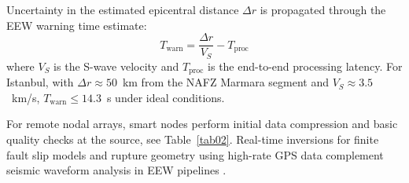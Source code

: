 \documentclass[data,article,accept,pdftex,moreauthors]{Definitions/mdpi}
\begin{document}

Uncertainty in the estimated epicentral distance $\Delta r$ is propagated through the EEW warning time estimate:
\begin{equation}
T_{\text{warn}} = \frac{\Delta r}{V_S} - T_{\text{proc}}
\end{equation}
where $V_S$ is the S-wave velocity and $T_{\text{proc}}$ is the end-to-end processing latency. For Istanbul, with $\Delta r \approx 50$~km from the NAFZ Marmara segment and $V_S \approx 3.5$~km/s, $T_{\text{warn}} \leq 14.3$~s under ideal conditions.

For remote nodal arrays, smart nodes perform initial data compression and basic quality checks at the source, see Table~\ref{tab02}. Real-time inversions for finite fault slip models and rupture geometry using high-rate GPS data complement seismic waveform analysis in EEW pipelines \cite{Minson2014}. %
\end{document}
